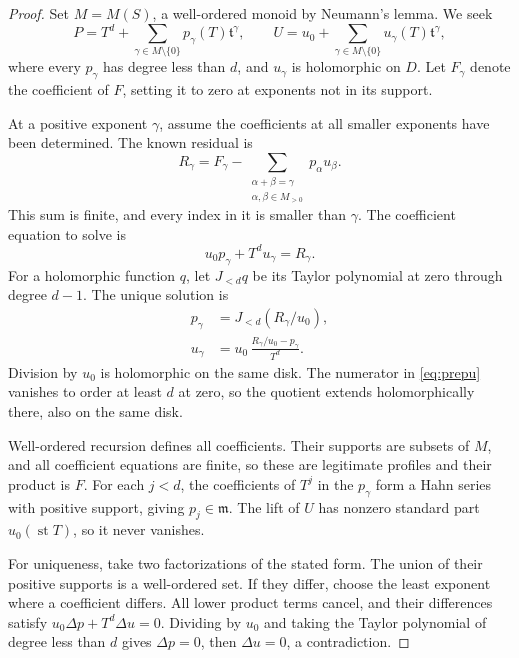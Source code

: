 \documentclass[11pt,a4paper]{article}
\numberwithin{equation}{section}
\theoremstyle{definition}
\newcommand{\tmon}{\mathfrak t}
\newcommand{\mm}{\mathfrak m}
\newcommand{\st}{\operatorname{st}}
\begin{document}
\begin{proof}
Set $M=M(S)$, a well-ordered monoid by Neumann's lemma. We seek
\[
 P=T^d+\sum_{\gamma\in M\setminus\{0\}}p_\gamma(T)\tmon^\gamma,
 \qquad
 U=u_0+\sum_{\gamma\in M\setminus\{0\}}u_\gamma(T)\tmon^\gamma,
\]
where every $p_\gamma$ has degree less than $d$, and $u_\gamma$ is holomorphic
on $D$. Let $F_\gamma$ denote the coefficient of $F$, setting it to zero at
exponents not in its support.

At a positive exponent $\gamma$, assume the coefficients at all smaller
exponents have been determined. The known residual is
\begin{equation}\label{eq:prepresidual}
 R_\gamma=F_\gamma-
 \sum_{\substack{\alpha+\beta=\gamma\\\alpha,\beta\in M_{>0}}}
           p_\alpha u_\beta.
\end{equation}
This sum is finite, and every index in it is smaller than $\gamma$.
The coefficient equation to solve is
\begin{equation}\label{eq:preplinear}
 u_0p_\gamma+T^du_\gamma=R_\gamma.
\end{equation}
For a holomorphic function $q$, let $J_{<d}q$ be its Taylor polynomial at zero
through degree $d-1$. The unique solution is
\begin{align}
 p_\gamma&=J_{<d}(R_\gamma/u_0),\label{eq:prepp}\\
 u_\gamma&=
 u_0\,\frac{R_\gamma/u_0-p_\gamma}{T^d}.\label{eq:prepu}
\end{align}
Division by $u_0$ is holomorphic on the same disk. The numerator in
\eqref{eq:prepu} vanishes to order at least $d$ at zero, so the quotient
extends holomorphically there, also on the same disk.

Well-ordered recursion defines all coefficients. Their supports are subsets
of $M$, and all coefficient equations are finite, so these are legitimate
profiles and their product is $F$. For each $j<d$, the coefficients of $T^j$
in the $p_\gamma$ form a Hahn series with positive support, giving $p_j\in\mm$.
The lift of $U$ has nonzero standard part $u_0(\st T)$, so it never vanishes.

For uniqueness, take two factorizations of the stated form. The union of
their positive supports is a well-ordered set. If they differ, choose the
least exponent where a coefficient differs. All lower product terms cancel,
and their differences satisfy
$u_0\Delta p+T^d\Delta u=0$. Dividing by $u_0$ and taking the Taylor polynomial
of degree less than $d$ gives $\Delta p=0$, then $\Delta u=0$, a contradiction.
\end{proof}
\end{document}
